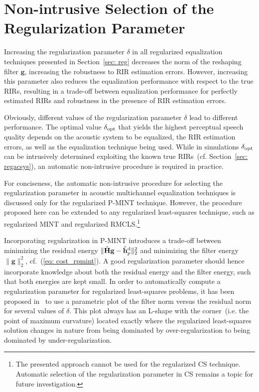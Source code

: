 \documentclass[10pt]{IEEEtran}
\begin{document}
\section{Non-intrusive Selection of the Regularization Parameter}
\label{sec: sel_reg}
Increasing the regularization parameter $\delta$ in all regularized equalization techniques presented in Section~\ref{sec: reg} decreases the norm of the reshaping filter $\mathbf{g}$, increasing the robustness to RIR estimation errors.
However, increasing this parameter also reduces the equalization performance with respect to the true RIRs, resulting in a trade-off between equalization performance for perfectly estimated RIRs and robustness in the presence of RIR estimation errors.

Obviously, different values of the regularization parameter $\delta$ lead to different performance.
The optimal value $\delta_{\rm opt}$ that yields the highest perceptual speech quality depends on the acoustic system to be equalized, the RIR estimation errors, as well as the equalization technique being used.
While in simulations $\delta_{\rm opt}$ can be intrusively determined exploiting the known true RIRs~(cf. Section~\ref{sec: regacsys}), an automatic non-intrusive procedure is required in practice.

For conciseness, the automatic non-intrusive procedure for selecting the regularization parameter in acoustic multichannel equalization techniques is discussed only for the regularized P-MINT technique.
However, the procedure proposed here can be extended to any regularized least-squares technique, such as regularized MINT and regularized RMCLS.\footnote{The presented approach cannot be used for the regularized CS technique. Automatic selection of the regularization parameter in CS remains a topic for future investigation.}

Incorporating regularization in P-MINT introduces a trade-off between minimizing the residual energy $\|\hat{\mathbf{H}}\mathbf{g} - \hat{\mathbf{h}}_p^{\rm d} \|_2^2$ and minimizing the filter energy $\|\mathbf{g}\|_2^2$, cf.~(\ref{eq: cost_rpmint}).
A good regularization parameter should hence incorporate knowledge about both the residual energy and the filter energy, such that both energies are kept small.
In order to automatically compute a regularization parameter for regularized least-squares problems, it has been proposed in~\cite{Hansen_1993} to use a parametric plot of the filter norm versus the residual norm for several values of $\delta$.
This plot always has an L-shape with the corner~(i.e. the point of maximum curvature) located exactly where the regularized least-squares solution changes in nature from being dominated by over-regularization to being dominated by under-regularization.
\end{document}
